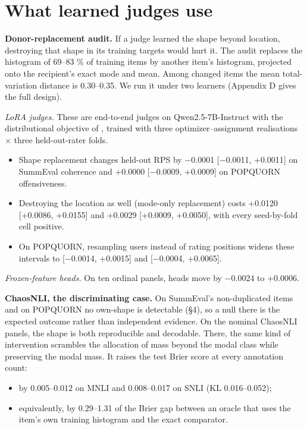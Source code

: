 \documentclass{article}
\providecommand{\tightlist}{\setlength{\itemsep}{0pt}\setlength{\parskip}{0pt}}
\begin{document}
\section{What learned judges use}

\textbf{Donor-replacement audit.} If a judge learned the shape beyond location, destroying that shape in its training targets would hurt it. The audit replaces the histogram of 69--83 \% of training items by another item's histogram, projected onto the recipient's exact mode and mean. Among changed items the mean total-variation distance is 0.30--0.35. We run it under two learners (Appendix D gives the full design).

\emph{LoRA judges.} These are end-to-end judges on Qwen2.5-7B-Instruct with the distributional objective of \citet{chen2025beyond}, trained with three optimizer--assignment realisations $\times$ three held-out-rater folds.

\begin{itemize}
\tightlist
\item
  Shape replacement changes held-out RPS by $-$0.0001 {[}$-$0.0011, +0.0011{]} on SummEval coherence and +0.0000 {[}$-$0.0009, +0.0009{]} on POPQUORN offensiveness.
\item
  Destroying the location as well (mode-only replacement) costs +0.0120 {[}+0.0086, +0.0155{]} and +0.0029 {[}+0.0009, +0.0050{]}, with every seed-by-fold cell positive.
\item
  On POPQUORN, resampling users instead of rating positions widens these intervals to {[}$-$0.0014, +0.0015{]} and {[}$-$0.0004, +0.0065{]}.
\end{itemize}

\emph{Frozen-feature heads.} On ten ordinal panels, heads move by $-$0.0024 to +0.0006.

\textbf{ChaosNLI, the discriminating case.} On SummEval's non-duplicated items and on POPQUORN no own-shape is detectable (\S{}4), so a null there is the expected outcome rather than independent evidence. On the nominal ChaosNLI panels, the shape is both reproducible and decodable. There, the same kind of intervention scrambles the allocation of mass beyond the modal class while preserving the modal mass. It raises the test Brier score at every annotation count:

\begin{itemize}
\tightlist
\item
  by 0.005--0.012 on MNLI and 0.008--0.017 on SNLI (KL 0.016--0.052);
\item
  equivalently, by 0.29--1.31 of the Brier gap between an oracle that uses the item's own training histogram and the exact comparator.
\end{itemize}
\end{document}
